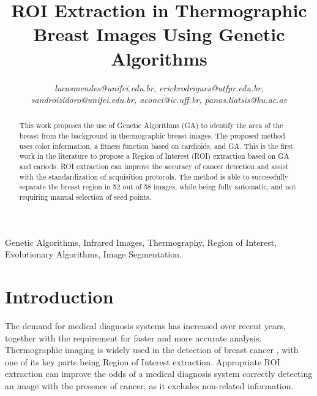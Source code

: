 \documentclass[conference]{IEEEtran}
\begin{document}
\title{ROI Extraction in Thermographic Breast Images Using Genetic Algorithms}



\author{
	\textit{lucasmendes@unifei.edu.br, erickrodrigues@utfpr.edu.br, sandroizidoro@unifei.edu.br, aconci@ic.uff.br, panos.liatsis@ku.ac.ae}}

\maketitle

\begin{abstract}
This work proposes the use of Genetic Algorithms (GA) to identify the area of the breast from the background in thermographic breast images. The proposed method uses color information, a fitness function based on cardioids, and GA. This is the first work in the literature to propose a Region of Interest (ROI) extraction based on GA and cariods. ROI extraction can improve the accuracy of cancer detection and assist with the standardization of acquisition protocols. The method is able to successfully separate the breast region in 52 out of 58 images, while being fully automatic, and not requiring manual selection of seed points.
\end{abstract}
\renewcommand\IEEEkeywordsname{Keywords}
\begin{IEEEkeywords}
Genetic Algorithms, Infrared Images, Thermography, Region of Interest, Evolutionary Algorithms, Image Segmentation.
\end{IEEEkeywords}

\section{Introduction}
The demand for medical diagnosis systems has increased over recent years, together with the requirement for faster and more accurate analysis. Thermographic imaging is widely used in the detection of breast cancer \cite{ARORA2008523, kenn09, WISHART2010535, SCHAEFER20091133, Acharya2012}, with one of its key parts being Region of Interest extraction. Appropriate ROI extraction can improve the odds of a medical diagnosis system correctly detecting an image with the presence of cancer, as it excludes non-related information.
\end{document}
